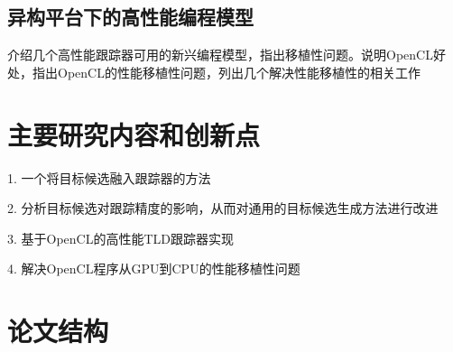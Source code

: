 \subsection{异构平台下的高性能编程模型}
介绍几个高性能跟踪器可用的新兴编程模型，指出移植性问题。说明OpenCL好处，指出OpenCL的性能移植性问题，列出几个解决性能移植性的相关工作


\section{主要研究内容和创新点}
1. 一个将目标候选融入跟踪器的方法

2. 分析目标候选对跟踪精度的影响，从而对通用的目标候选生成方法进行改进

3. 基于OpenCL的高性能TLD跟踪器实现

4. 解决OpenCL程序从GPU到CPU的性能移植性问题

\section{论文结构}